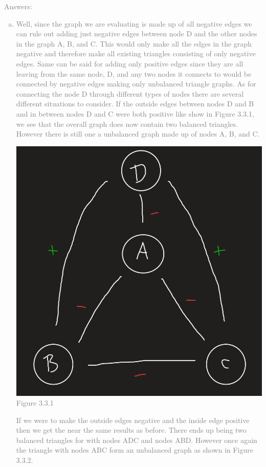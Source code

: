 \documentclass[11pt]{article}
\begin{document}
\textcolor{gray}{
Answers:
\begin{enumerate}[(a)]
	\item Well, since the graph we are evaluating is made up of all negative edges we can rule out adding just negative edges between node D and the other nodes in the graph A, B, and C.  This would only make all the edges in the graph negative and  therefore make all existing triangles consisting of only negative edges.  Same can be said for adding only positive edges since they are all leaving from the same node, D, and any two nodes it connects to would be connected by negative edges making only unbalanced triangle graphs. As for connecting the node D through different types of nodes there are several different situations to consider.  If the outside edges between nodes D and B and in between nodes D and C were both positive like show in Figure 3.3.1, we see that the overall graph does now contain two balanced triangles.  However there is still one a unbalanced graph made up of nodes A, B, and C.\\
\begin{center}
	\includegraphics[scale=1]{Figure_3_3_1}\\
	Figure 3.3.1
\end{center}
If we were to make the outside edges negative and the inside edge positive then we get the near the same results as before.  There ends up being two balanced triangles for with nodes ADC and nodes ABD.  However once again the triangle with nodes ABC form an unbalanced graph as shown in Figure 3.3.2. \\

\end{enumerate}}
\end{document}
